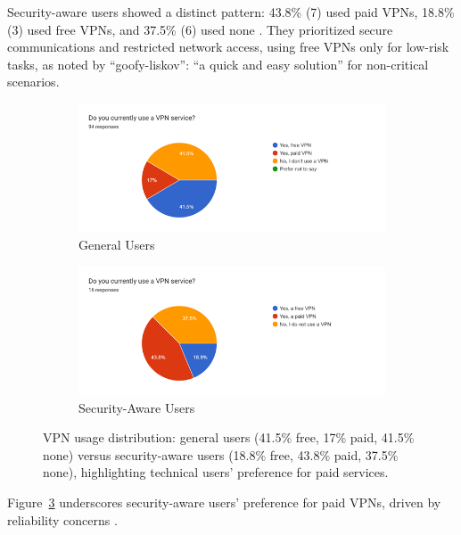 \documentclass[11pt,a4paper]{article}
\begin{document}
Security-aware users showed a distinct pattern: 43.8\% (7) used paid VPNs, 18.8\% (3) used free VPNs, and 37.5\% (6) used none \citep{Shetty2025}. They prioritized secure communications and restricted network access, using free VPNs only for low-risk tasks, as noted by ``goofy-liskov'': ``a quick and easy solution'' for non-critical scenarios.

\begin{figure}[ht]
    \centering
    \begin{subfigure}[b]{1.0\columnwidth}
        \centering
        \includegraphics[width=\textwidth]{general user vpn usage.png}
        \caption{General Users}
        \label{fig:general_users_usage}
    \end{subfigure}
    \hfill
    \begin{subfigure}[b]{1.0\columnwidth}
        \centering
        \includegraphics[width=\textwidth]{security aware usage.png}
        \caption{Security-Aware Users}
        \label{fig:security_aware_usage}
    \end{subfigure}
    \caption{VPN usage distribution: general users (41.5\% free, 17\% paid, 41.5\% none) versus security-aware users (18.8\% free, 43.8\% paid, 37.5\% none), highlighting technical users' preference for paid services.}
    \label{fig:vpn_usage}
\end{figure}

Figure~\ref{fig:vpn_usage} underscores security-aware users’ preference for paid VPNs, driven by reliability concerns \citep{Ramesh2023}.
\end{document}
